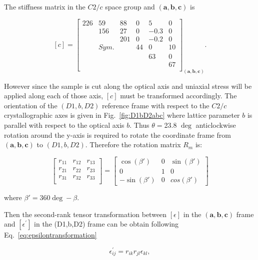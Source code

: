 The stiffness matrix in the $C2/c$ space group and $(\textbf{a},\textbf{b},\textbf{c})$ is


\begin{equation}
\label{eq:stiffnessmatrixC}
[c]=
\begin{bmatrix}
226 & 59 & 88 & 0 & 5 & 0 \\
& 156 & 27 & 0 & -0.3 & 0 \\
& & 201 & 0 & -0.2 & 0 \\
& Sym. & & 44 & 0 & 10 \\
& & & & 63 & 0 \\
& & & & & 67 \\
\end{bmatrix}_{(\textbf{a},\textbf{b},\textbf{c})}.
\end{equation}

However since the sample is cut along the optical axis and uniaxial stress will be applied along each of those axis, $[c]$ must be transformed accordingly. The orientation of the $(D1,b,D2)$ reference frame with respect to the $C2/c$ crystallographic axes is given in Fig.~\ref{fig:D1bD2abc} where lattice parameter $b$ is parallel with respect to the optical axis $b$. Thus $\theta=$23.8 $\deg$ anticlockwise rotation around the y-axis is required to rotate the coordinate frame from $(\textbf{a},\textbf{b},\textbf{c})$ to $(D1,b,D2)$. Therefore the rotation matrix $R_{m}$ is:

\begin{equation}
\label{eq:rotateatoD1}
\begin{bmatrix}
r_{11} & r_{12} & r_{13} \\
r_{21} & r_{22} & r_{23} \\
r_{31} & r_{32} & r_{33} \\
\end{bmatrix}=
\begin{bmatrix}
\cos{(\beta')} & 0 & \sin{(\beta')} \\
0 & 1 & 0 \\
-\sin{(\beta')} & 0 & cos{(\beta')}
\end{bmatrix}
\end{equation}

\noindent where $\beta'=360 \deg - \beta$. 


Then the second-rank tensor transformation between $[\epsilon]$ in the $(\textbf{a},\textbf{b},\textbf{c})$ frame and $[\epsilon^{'}]$ in the (D1,b,D2) frame can be obtain following Eq.~\ref{eq:epsilontransformation} 

\begin{equation}
\label{eq:epsilontransformation}
\epsilon_{ij}^{'}=r_{ik}r_{jl}\epsilon_{kl},
\end{equation}

